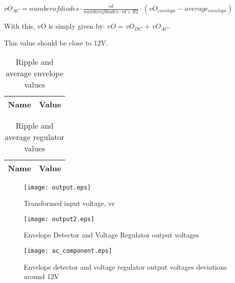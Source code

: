$vO_{AC} = number of diodes \cdot \frac{rd}{number of diodes \cdot rd+R2} \cdot (vO_{envelope}-average_{envelope})$

With this, vO is simply given by: $vO$ = $vO_{DC}$ + $vO_{AC}$.

This value should be close to 12V.

\begin{table}[ht]
  \centering
  \begin{tabular}{|l|r|}
    \hline    
    {\bf Name} & {\bf Value} \\ \hline
	
  \end{tabular}
  \caption{Ripple and average envelope values}
	\label{tab:envelope}
\end{table}

\begin{table}[ht]
  \centering
  \begin{tabular}{|l|r|}
    \hline    
    {\bf Name} & {\bf Value} \\ \hline
        
  \end{tabular}
  \caption{Ripple and average regulator values} 
        \label{tab:regulator}
\end{table}     



\begin{figure}[h] \centering
\texttt{[image: output.eps]}
	\caption{Transformed input voltage, vr}
	\label{fig:output}
\end{figure}


\begin{figure}[h] \centering
\texttt{[image: output2.eps]}
	\caption{Envelope Detector and Voltage Regulator output voltages}
	\label{fig:output2}
\end{figure}

\begin{figure}[h] \centering                                          
\texttt{[image: ac\_component.eps]}          
	\caption{Envelope detector and voltage regulator output voltages deviations around 12V}                                   
        \label{fig:ac_dc}                                            
\end{figure}







